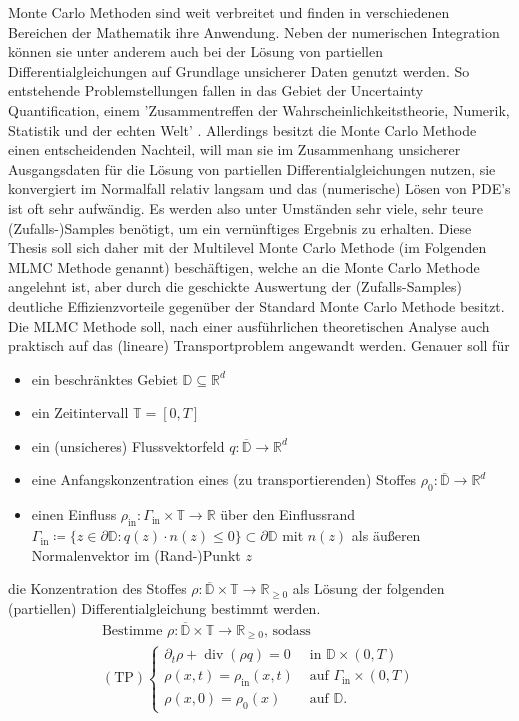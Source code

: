\documentclass[12pt,a4paper]{scrartcl}
\numberwithin{equation}{section}
\newcommand{\R}{\mathbb{R}} %
\DeclareMathOperator{\dive}{div}
\begin{document}
Monte Carlo Methoden sind weit verbreitet und finden in verschiedenen Bereichen der Mathematik ihre Anwendung.
Neben der numerischen Integration können sie unter anderem auch bei der Lösung von partiellen Differentialgleichungen auf Grundlage unsicherer Daten genutzt werden.
So entstehende Problemstellungen fallen in das Gebiet der Uncertainty Quantification, einem 'Zusammentreffen der Wahrscheinlichkeitstheorie, Numerik, Statistik und der echten Welt' \cite{sullivan2015introduction}.
Allerdings besitzt die Monte Carlo Methode einen entscheidenden Nachteil, will man sie im Zusammenhang unsicherer Ausgangsdaten für die Lösung von partiellen Differentialgleichungen nutzen, sie konvergiert im Normalfall relativ langsam und das (numerische) Lösen von PDE's ist oft sehr aufwändig.
Es werden also unter Umständen sehr viele, sehr teure (Zufalls-)Samples benötigt, um ein vernünftiges Ergebnis zu erhalten. \newline
Diese Thesis soll sich daher mit der Multilevel Monte Carlo Methode (im Folgenden MLMC Methode genannt) beschäftigen, welche an die Monte Carlo Methode angelehnt ist, aber durch die geschickte Auswertung der (Zufalls-Samples) deutliche Effizienzvorteile gegenüber der Standard Monte Carlo Methode besitzt.
Die MLMC Methode soll, nach einer ausführlichen theoretischen Analyse auch praktisch auf das (lineare) Transportproblem angewandt werden.
Genauer soll für
\begin{itemize}
	\item ein beschränktes Gebiet $\mathbb{D} \subseteq \R^d$
	\item  ein Zeitintervall $\mathbb{T} = [0,T]$
	\item  ein (unsicheres) Flussvektorfeld $q: \overline{\mathbb{D}} \rightarrow \R^d$
	\item  eine Anfangskonzentration eines (zu transportierenden) Stoffes $\rho_0: \overline{\mathbb{D}} \rightarrow \R^d$
	\item einen Einfluss $\rho_{\text{in}} : \Gamma_{\text{in}} \times \mathbb{T} \rightarrow \R$ über den Einflussrand $\Gamma_{\text{in}} \coloneqq  \{ z \in \partial \mathbb{D}: q(z)\cdot n(z) \leq 0 \} \subset  \partial \mathbb{D}$ mit $n(z)$ als äußeren Normalenvektor im (Rand-)Punkt $z$
\end{itemize}
    die Konzentration des Stoffes $\rho: \overline{\mathbb{D}} \times \mathbb{T}  \rightarrow \R_{\geq0}$ als Lösung der folgenden (partiellen) Differentialgleichung bestimmt werden.
\begin{gather*}
\text{Bestimme } \rho: \overline{\mathbb{D}} \times \mathbb{T} \to \R_{\geq 0} \text{, sodass}\\
(\text{TP})
\begin{cases}
\partial_t \rho + \dive(\rho q) = 0 &\text{ in } \mathbb{D} \times (0,T)\\
\rho(x,t) = \rho_{\text{in}}(x,t) &\text{ auf } \Gamma_{\text{in}} \times (0,T)\\
\rho(x,0) = \rho_0(x) &\text{ auf } \mathbb{D}.
\end{cases}
\end{gather*}
\end{document}

